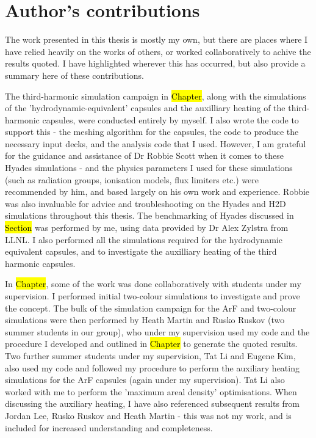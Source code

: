 \section{Author's contributions}

The work presented in this thesis is mostly my own, but there are places where I have relied heavily on the works of others, or worked collaboratively to achive the results quoted. I have highlighted wherever this has occurred, but also provide a summary here of these contributions.

The third-harmonic simulation campaign in \hl{Chapter}, along with the simulations of the 'hydrodynamic-equivalent' capsules and the auxilliary heating of the third-harmonic capsules, were conducted entirely by myself. I also wrote the code to support this - the meshing algorithm for the capsules, the code to produce the necessary input decks, and the analysis code that I used. However, I am grateful for the guidance and assistance of Dr Robbie Scott when it comes to these Hyades simulations - and the physics parameters I used for these simulations (such as radiation groups, ionisation models, flux limiters etc.) were recommended by him, and based largely on his own work and experience. Robbie was also invaluable for advice and troubleshooting on the Hyades and H2D simulations throughout this thesis. The benchmarking of Hyades discussed in \hl{Section} was performed by me, using data provided by Dr Alex Zylstra from LLNL. I also performed all the simulations required for the hydrodynamic equivalent capsules, and to investigate the auxilliary heating of the third harmonic capsules.

In \hl{Chapter}, some of the work was done collaboratively with students under my supervision. I performed initial two-colour simulations to investigate and prove the concept. The bulk of the simulation campaign for the ArF and two-colour simulations were then performed by Heath Martin and Rusko Ruskov (two summer students in our group), who under my supervision used my code and the procedure I developed and outlined in \hl{Chapter} to generate the quoted results. Two further summer students under my supervision, Tat Li and Eugene Kim, also used my code and followed my procedure to perform the auxiliary heating simulations for the ArF capsules (again under my supervision). Tat Li also worked with me  to perform the 'maximum areal density' optimisations. When discussing the auxiliary heating, I have also referenced subsequent results from Jordan Lee, Rusko Ruskov and Heath Martin - this was not my work, and is included for increased understanding and completeness.

